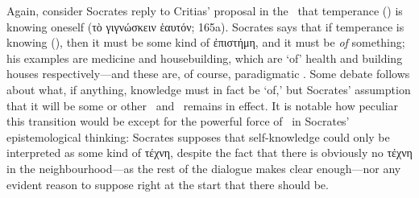 \documentclass[11pt,letterpaper,oneside]{amsart} %
\begin{document}
 
  












Again, consider Socrates reply to Critias' proposal in the \charm\ that temperance (\sophrosune) is knowing oneself (τὸ γιγνώσκειν ἑαυτόν; 165a). Socrates says that if temperance is knowing (\gignoskein), then it must be some kind of ἐπιστήμη, and it must be \emph{of} something; his examples are medicine and housebuilding, which are `of' health and building houses respectively---and these are, of course, paradigmatic \technai. Some debate follows about what, if anything, knowledge must in fact be `of,' but Socrates' assumption that it will be some or other \episteme\ and \techne\ remains in effect. It is notable how peculiar this transition would be except for the powerful force of \techne\ in Socrates' epistemological thinking: Socrates supposes that self-knowledge could only be interpreted as some kind of τέχνη, despite the fact that there is obviously no τέχνη in the neighbourhood---as the rest of the dialogue makes clear enough---nor any evident reason to suppose right at the start that there should be.



 
\end{document}
